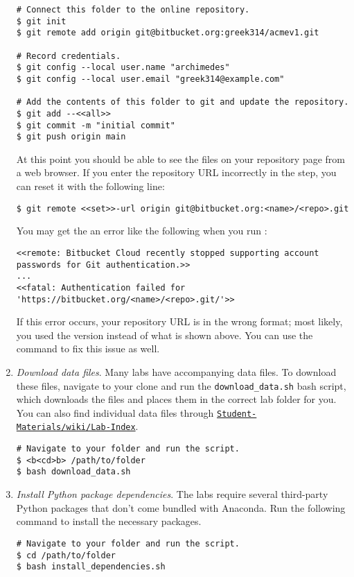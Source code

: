 \begin{enumerate}
\begin{lstlisting}
# Connect this folder to the online repository.
$ git init
$ git remote add origin git@bitbucket.org:greek314/acmev1.git

# Record credentials.
$ git config --local user.name "archimedes"
$ git config --local user.email "greek314@example.com"

# Add the contents of this folder to git and update the repository.
$ git add --<<all>>
$ git commit -m "initial commit"
$ git push origin main
\end{lstlisting}

At this point you should be able to see the files on your repository page from a web browser.
If you enter the repository URL incorrectly in the  step, you can reset it with the following line:
\begin{lstlisting}
$ git remote <<set>>-url origin git@bitbucket.org:<name>/<repo>.git
\end{lstlisting}
\begin{info}
You may get the an error like the following when you run :
\begin{lstlisting}
<<remote: Bitbucket Cloud recently stopped supporting account passwords for Git authentication.>>
...
<<fatal: Authentication failed for 'https://bitbucket.org/<name>/<repo>.git/'>>
\end{lstlisting}
If this error occurs, your repository URL is in the wrong format; most likely, you used the  version instead of what is shown above.
You can use the  command to fix this issue as well.
\end{info}

\item \emph{Download data files}.
\label{step:download-data}
Many labs have accompanying data files.
To download these files, navigate to your clone and run the \texttt{download\_data.sh} bash script, which downloads the files and places them in the correct lab folder for you.
You can also find individual data files through \href{https://github.com/Foundations-of-Applied-Mathematics/Student-Materials/wiki/Lab-Index}{\texttt{Student-Materials/wiki/Lab-Index}}.

\begin{lstlisting}
# Navigate to your folder and run the script.
$ <b<cd>b> /path/to/folder
$ bash download_data.sh
\end{lstlisting}

\item \emph{Install Python package dependencies}.
\label{step:install-dependencies}
The labs require several third-party Python packages that don't come bundled with Anaconda.
Run the following command to install the necessary packages.
\begin{lstlisting}
# Navigate to your folder and run the script.
$ cd /path/to/folder
$ bash install_dependencies.sh
\end{lstlisting}


\end{enumerate}
